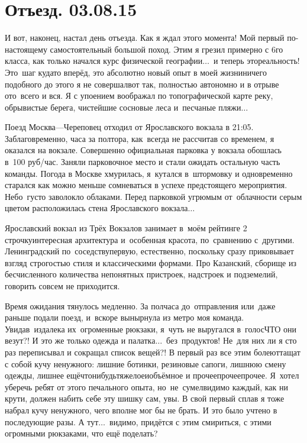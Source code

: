 \chapter{Отъезд. 03.08.15}
\vepsianrose

И вот, наконец, настал день отъезда. Как я ждал этого момента! Мой первый по-настоящему самостоятельный большой поход. Этим я грезил примерно с 6\sdash го класса, как только начался курс физической географии$\ldots$~и теперь это\mdash реальность! Это~шаг куда\sdash то вперёд, это абсолютно новый опыт в моей жизни\mdash ничего подобного до этого я не совершал\mdash вот так, полностью автономно и в отрыве ото~всего и вся. Я с упоением воображал по топографической карте реку, обрывистые берега, чистейшие сосновые леса и~песчаные пляжи$\ldots$ 

Поезд Москва\thinspace---\thinspace Череповец отходил от Ярославского вокзала в 21:05. Заблаговременно, часа за полтора, как~всегда не рассчитав со временем, я оказался на вокзале. Совершенно официальная парковка у вокзала обошлась в~100 руб/час. Заняли парковочное место и стали ожидать остальную часть команды. Погода в Москве хмурилась, я~кутался в~штормовку и одновременно старался как можно меньше сомневаться в успехе предстоящего мероприятия. Небо~густо заволокло облаками. Перед парковкой угрюмым от~облачности серым цветом расположилась стена Ярославского вокзала$\ldots$

Ярославский вокзал из Трёх Вокзалов занимает в~моём рейтинге 2 строчку\mdash интересная архитектура и~особенная красота, по~сравнению с~другими. Ленинградский по~соседству\mdash первую, естественно, поскольку сразу приковывает взгляд строгостью стиля и классическими формами. Про Казанский, сборище из бесчисленного количества непонятных пристроек, надстроек и подземелий, говорить совсем не приходится.

Время ожидания тянулось медленно. За полчаса до~отправления или~даже раньше подали поезд, и~вскоре вынырнула из метро моя команда. Увидав~издалека их~огроменные рюкзаки, я~чуть не выругался в~голос\mdash ЧТО они везут?! И это же только одежда и палатка$\ldots$~без~продуктов! Не~для них ли я сто раз переписывал и сокращал список вещей?! В первый раз все этим болеют\mdash тащат с собой кучу ненужного: лишние ботинки, резиновые сапоги, лишнюю смену одежды, лишнее ещё\sdash что\sdash нибудь\sdash тяжелое\sdash и\sdash объёмное и прочее\sdash прочее\sdash прочее. Я~хотел уберечь ребят от этого печального опыта, но~не~сумел\mdash видимо каждый, как ни крути, должен набить себе эту шишку сам, увы. В свой первый сплав я тоже набрал кучу ненужного, чего вполне мог бы не брать. И это было учтено в последующие разы. А тут$\ldots$~видимо, придётся с этим смириться, с этими огромными рюкзаками, что ещё поделать?

